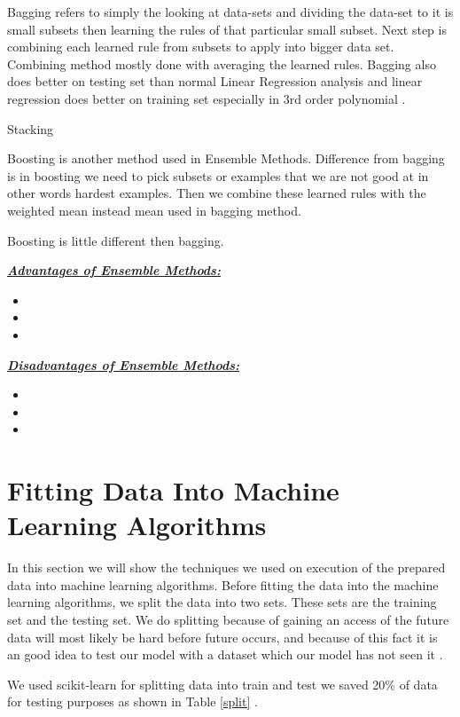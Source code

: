 \documentclass[sigconf]{acmart}
\begin{document}
\par Bagging refers to simply the looking at data-sets and dividing the data-set to it is small subsets then learning the rules of that particular small subset. Next step is combining each learned rule from subsets to apply into bigger data set. Combining method mostly done with averaging the learned rules. Bagging also does better on testing set than normal Linear Regression analysis and linear regression does better on training set especially in 3rd order polynomial \cite{dietterich-ensemble}.  

\par Stacking 

\par Boosting is another method used in Ensemble Methods. Difference from bagging is in boosting we need to pick subsets or examples that we are not good at in other words hardest examples. Then we combine these learned rules with the weighted mean instead mean used in bagging method. 

\par Boosting is little different then bagging. 

\textbf{\underline{\textit{Advantages of Ensemble Methods:}}} 
\begin{itemize}
\item
\item
\item
\end{itemize}

\textbf{\underline{\textit{Disadvantages of Ensemble Methods:}}}
\begin{itemize}
\item
\item
\item
\end{itemize}


\section{Fitting Data Into Machine Learning Algorithms}

In this section we will show the techniques we used on execution of the prepared data into machine learning algorithms. Before fitting the data into the machine learning algorithms, we split the data into two sets. These sets are the training set and the testing set. We do splitting because of gaining an access of the future data will most likely be hard before future occurs, and because of this fact it is an good idea to test our model with a dataset which our model has not seen it \cite{www-salford}. 
\par We used scikit-learn for splitting data into train and test we saved 20\% of data for testing purposes as shown in Table \ref{split} . 
\end{document}
